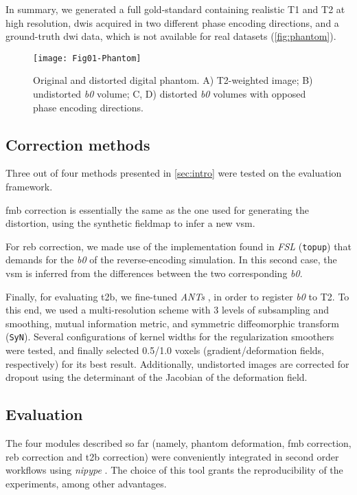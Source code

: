 In summary, we generated 
a full gold-standard containing realistic T1 and T2
at high resolution, \glspl*{dwi} acquired in two
different phase encoding directions, and a ground-truth
\gls*{dwi} data, which is not available for real datasets
(\autoref{fig:phantom}).


\begin{figure}[thpb]
   \centering
   \texttt{[image: Fig01-Phantom]}
   \caption{Original and distorted digital phantom.
   A) T2-weighted image; B) undistorted \textit{b0} volume;
   C, D) distorted \textit{b0} volumes with opposed phase encoding 
   directions.}
   \label{fig:phantom}
\end{figure}

\subsection{Correction methods}

Three out of four methods presented in \autoref{sec:intro}
were tested on the evaluation framework. 

\Gls*{fmb} correction
is essentially the same as the one used for generating the 
distortion, using the synthetic fieldmap to infer a new \gls*{vsm}.

For \Gls*{reb} correction, we made use of the implementation found 
in \emph{FSL} (\texttt{topup})
that demands for the \textit{b0} of the reverse-encoding simulation.
In this second case, the \gls*{vsm} is inferred from the differences
between the two corresponding \textit{b0}.

Finally, for evaluating \Gls*{t2b},
we fine-tuned \emph{ANTs} \cite{avants_ants:_2013},
in order to register \textit{b0} to T2. To this end, we used a
multi-resolution scheme with 3 levels of subsampling and smoothing,
mutual information metric, and symmetric diffeomorphic transform 
(\texttt{SyN}). Several configurations of kernel widths for the 
regularization smoothers were tested, and finally selected 
0.5/1.0 voxels (gradient/deformation fields, respectively) 
for its best result. Additionally, undistorted images are 
corrected for dropout using the determinant
of the Jacobian of the deformation field.

\subsection{Evaluation}

The four modules described so far (namely, phantom
deformation, \gls*{fmb} correction, \gls*{reb}
correction and \gls*{t2b} correction) were conveniently
integrated in second order workflows using
\emph{nipype} \cite{gorgolewski_nipype:_2011}.
The choice of this tool grants the reproducibility
of the experiments, among other advantages.

